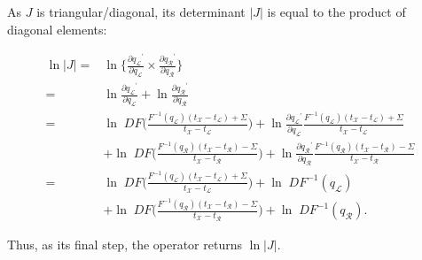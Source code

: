 \documentclass[12pt]{article}
\begin{document}
As $J$ is triangular/diagonal, its determinant $|J|$ is equal to the product of diagonal elements:



\begin{align}
	\ln |J| =&  \ln \{ \frac{\partial {q_\mathcal{L}}^\prime}{\partial q_\mathcal{L}} \times \frac{\partial {q_\mathcal{R}}^\prime}{\partial q_\mathcal{R}} \} \nonumber \\
			=& \ln  \frac{\partial {q_\mathcal{L}}^\prime}{\partial q_\mathcal{L}} + \ln \frac{\partial {q_\mathcal{R}}^\prime}{\partial q_\mathcal{R}}\nonumber \\
			=& \ln \; D F\big( \frac{F^{-1} (q_\mathcal{L}) (t_\mathcal{X} - t_\mathcal{L}) + \Sigma}{t_\mathcal{X} - t_\mathcal{L}} \big) + \ln \frac{\partial {q_\mathcal{L}}^\prime}{\partial q_\mathcal{L}}  \frac{F^{-1} (q_\mathcal{L}) (t_\mathcal{X} - t_\mathcal{L}) + \Sigma}{t_\mathcal{X} - t_\mathcal{L}} \nonumber\\
			&+ \ln \; D F\big( \frac{F^{-1} (q_\mathcal{R}) (t_\mathcal{X} - t_\mathcal{R}) - \Sigma}{t_\mathcal{X} - t_\mathcal{R}} \big) + \ln \frac{\partial {q_\mathcal{R}}^\prime}{\partial q_\mathcal{R}}  \frac{F^{-1} (q_\mathcal{R}) (t_\mathcal{X} - t_\mathcal{R}) - \Sigma}{t_\mathcal{X} - t_\mathcal{R}} \nonumber\\
			=& \ln \; D F\big( \frac{F^{-1} (q_\mathcal{L}) (t_\mathcal{X} - t_\mathcal{L}) + \Sigma}{t_\mathcal{X} - t_\mathcal{L}} \big) + \ln \; D F^{-1} (q_\mathcal{L}) \nonumber \\
			&+ \ln \; D F\big( \frac{F^{-1} (q_\mathcal{R}) (t_\mathcal{X} - t_\mathcal{R}) - \Sigma}{t_\mathcal{X} - t_\mathcal{R}} \big) + \ln \; DF^{-1} (q_\mathcal{R}) .
\end{align}


Thus, as its final step, the operator returns $\ln |J|$.






\end{document}
